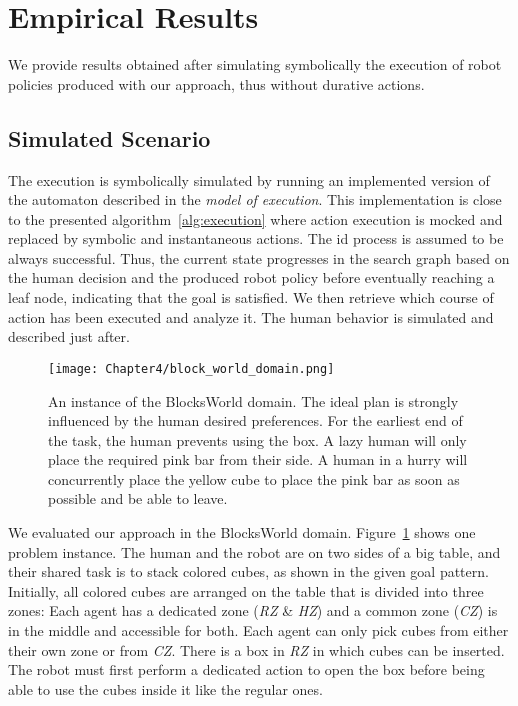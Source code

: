 \section{Empirical Results}

We provide results obtained after simulating symbolically the execution of robot policies produced with our approach, thus without durative actions. 

    \subsection*{Simulated Scenario}

The execution is symbolically simulated by running an implemented version of the automaton described in the \textit{model of execution}. This implementation is close to the presented algorithm~\ref{alg:execution} where action execution is mocked and replaced by symbolic and instantaneous actions. 
The \acrshort{id} process is assumed to be always successful.
Thus, the current state progresses in the search graph based on the human decision and the produced robot policy before eventually reaching a leaf node, indicating that the goal is satisfied. 
We then retrieve which course of action has been executed and analyze it.
The human behavior is simulated and described just after. 

\begin{figure}[h]
    \centering
    \texttt{[image: Chapter4/block\_world\_domain.png]}
    \caption{An instance of the BlocksWorld domain. The ideal plan is strongly influenced by the human desired preferences. For the earliest end of the task, the human prevents using the box. A lazy human will only place the required pink bar from their side. A human in a hurry will concurrently place the yellow cube to place the pink bar as soon as possible and be able to leave.}
    \label{fig:block_world_domain}
\end{figure}

We evaluated our approach in the BlocksWorld domain. Figure~\ref{fig:block_world_domain} shows one problem instance. 
The human and the robot are on two sides of a big table, and their shared task is to stack colored cubes, as shown in the given goal pattern. 
Initially, all colored cubes are arranged on the table that is divided into three zones: Each agent has a dedicated zone (\textit{RZ} \& \textit{HZ}) and a common zone (\textit{CZ}) is in the middle and accessible for both. 
Each agent can only pick cubes from either their own zone or from \textit{CZ}. 
There is a box in \textit{RZ} in which cubes can be inserted. The robot must first perform a dedicated action to open the box before being able to use the cubes inside it like the regular ones.


